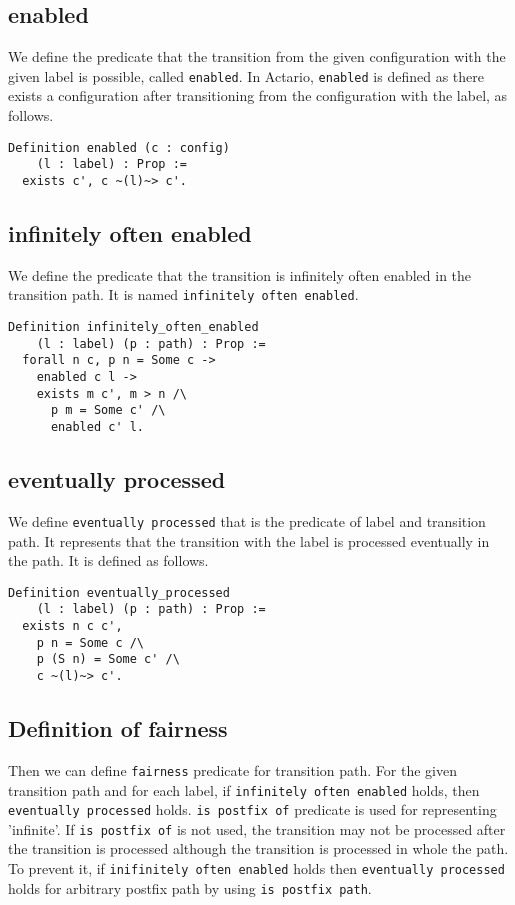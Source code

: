 \subsection{enabled}
We define the predicate that the transition from the given configuration with the given label is possible, called \texttt{enabled}.
In Actario, \texttt{enabled} is defined as there exists a configuration after transitioning from the configuration with the label, as follows.

\begin{lstlisting}
Definition enabled (c : config)
    (l : label) : Prop :=
  exists c', c ~(l)~> c'.
\end{lstlisting}

\subsection{infinitely often enabled}
We define the predicate that the transition is infinitely often enabled in the transition path.
It is named \texttt{infinitely often enabled}.

\begin{lstlisting}
Definition infinitely_often_enabled
    (l : label) (p : path) : Prop :=
  forall n c, p n = Some c ->
    enabled c l ->
    exists m c', m > n /\
      p m = Some c' /\
      enabled c' l.
\end{lstlisting}


\subsection{eventually processed}
We define \texttt{eventually processed} that is the predicate of label and transition path.
It represents that the transition with the label is processed eventually in the path.
It is defined as follows.

\begin{lstlisting}
Definition eventually_processed
    (l : label) (p : path) : Prop :=
  exists n c c',
    p n = Some c /\
    p (S n) = Some c' /\
    c ~(l)~> c'.
\end{lstlisting}


\subsection{Definition of fairness}
Then we can define \texttt{fairness} predicate for transition path.
For the given transition path and for each label, if \texttt{infinitely often enabled} holds, then \texttt{eventually processed} holds.
\texttt{is postfix of} predicate is used for representing 'infinite'.
If \texttt{is postfix of} is not used, the transition may not be processed after the transition is processed although the transition is processed in whole the path.
To prevent it, if \texttt{inifinitely often enabled} holds then \texttt{eventually processed} holds for arbitrary postfix path by using \texttt{is postfix path}.

